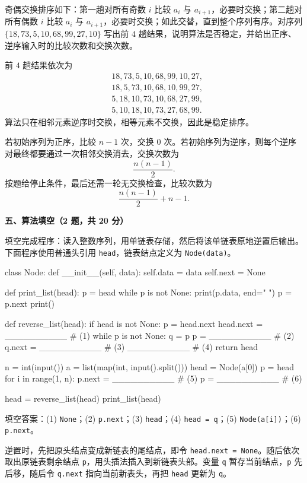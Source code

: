 \begin{question}[奇偶交换排序]
奇偶交换排序如下：第一趟对所有奇数 $i$ 比较 $a_i$ 与 $a_{i+1}$，必要时交换；第二趟对所有偶数 $i$ 比较 $a_i$ 与 $a_{i+1}$，必要时交换；如此交替，直到整个序列有序。对序列 $\{18,73,5,10,68,99,27,10\}$ 写出前 $4$ 趟结果，说明算法是否稳定，并给出正序、逆序输入时的比较次数和交换次数。
\begin{solution}
前 $4$ 趟结果依次为
\[
\begin{aligned}
&18,73,5,10,68,99,10,27,\\
&18,5,73,10,68,10,99,27,\\
&5,18,10,73,10,68,27,99,\\
&5,10,18,10,73,27,68,99.
\end{aligned}
\]
算法只在相邻元素逆序时交换，相等元素不交换，因此是稳定排序。

若初始序列为正序，比较 $n-1$ 次，交换 $0$ 次。若初始序列为逆序，则每个逆序对最终都要通过一次相邻交换消去，交换次数为
\[
\frac{n(n-1)}{2}.
\]
按题给停止条件，最后还需一轮无交换检查，比较次数为
\[
\frac{n(n-1)}{2}+n-1.
\]
\end{solution}
\end{question}

\textbf{五、算法填空（2 题，共 20 分）}

\begin{question}[单链表逆置]
填空完成程序：读入整数序列，用单链表存储，然后将该单链表原地逆置后输出。下面程序使用普通头引用 \texttt{head}，链表结点定义为 \texttt{Node(data)}。

\begin{pycode}
class Node:
    def __init__(self, data):
        self.data = data
        self.next = None


def print_list(head):
    p = head
    while p is not None:
        print(p.data, end=" ")
        p = p.next
    print()


def reverse_list(head):
    if head is not None:
        p = head.next
        head.next = __________                  # (1)
        while p is not None:
            q = p
            p = __________                      # (2)
            q.next = __________                 # (3)
            __________                          # (4)
    return head

n = int(input())
a = list(map(int, input().split()))
head = Node(a[0])
p = head
for i in range(1, n):
    p.next = __________                         # (5)
    p = __________                              # (6)

head = reverse_list(head)
print_list(head)
\end{pycode}
\begin{solution}
填空答案：(1) \texttt{None}；(2) \texttt{p.next}；(3) \texttt{head}；(4) \texttt{head = q}；(5) \texttt{Node(a[i])}；(6) \texttt{p.next}。

逆置时，先把原头结点变成新链表的尾结点，即令 \texttt{head.next = None}。随后依次取出原链表剩余结点 \texttt{p}，用头插法插入到新链表头部。变量 \texttt{q} 暂存当前结点，\texttt{p} 先后移，随后令 \texttt{q.next} 指向当前新表头，再把 \texttt{head} 更新为 \texttt{q}。
\end{solution}
\end{question}


